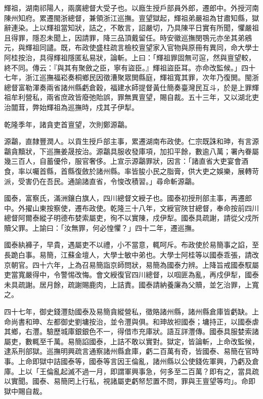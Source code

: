 \begin{pinyinscope}
輝祖，湖南祁陽人，兩廣總督大受子也。以廕生授戶部員外郎，遷郎中。外授河南陳州知府。累遷閩浙總督，兼領浙江巡撫。亶望獄起，輝祖弟嚴祖為甘肅知縣，獄辭連染。上以輝祖當知狀，詰之，不敢言，詔嚴切，乃具陳平日實有所聞，懼嚴祖且得罪，隱忍未聞上，因請罪，降三品頂戴留任。時安徽巡撫閔鶚元亦坐其弟鵷元，與輝祖同譴。既，布政使盛柱疏言檢校亶望家入官物與原冊有異同，命大學士阿桂按治，具得輝祖隱匿私易狀，論斬。上曰：「輝祖罪固無可逭，然與亶望較，終不同。傳云：『與其有聚斂之臣，寧有盜臣。』輝祖盜臣耳。亦命改監候。」四十七年，浙江巡撫福崧奏桐鄉民因徵漕聚眾閧縣庭，輝祖寬其罪，次年乃復閧。閩浙總督富勒渾奏兩省諸州縣虧倉穀，福建水師提督黃仕簡奏臺灣民互斗，於是上罪輝祖牟利營私，兩省庶政皆廢弛貽誤，罪無異亶望，賜自裁。五十三年，又以湖北吏治闒茸，弊始輝祖為巡撫時，戍其子伊犁。

乾隆季年，諸貪吏首亶望，次則鄭源鸘。

源鸘，直隸豐潤人。以貢生授戶部主事，累遷湖南布政使。仁宗既誅和珅，有言源鸘貪黷狀，下巡撫姜晟按治。源鸘具服收發庫項，加扣平餘，數逾八萬；署內眷屬幾三百人，自蓄優伶，服官奢侈。上宣示源鸘罪狀，因言：「諸直省大吏宴會酒食，率以囑首縣，首縣復斂於諸州縣。率皆朘小民之脂膏，供大吏之娛樂，展轉苛派，受害仍在吾民。通諭諸直省，令悛改積習。」尋命斬源鸘。

國泰，富察氏，滿洲鑲白旗人，四川總督文綬子也。國泰初授刑部主事，再遷郎中。外擢山東按察使，遷布政使。乾隆三十八年，文綬官陜甘總督，奉命按前四川總督阿爾泰縱子明德布婪索屬吏，徇不以實陳，戍伊犁。國泰具疏謝，請從父戍所贖父罪。上諭曰：「汝無罪，何必惶懼？」四十二年，遷巡撫。

國泰紈褲子，早貴，遇屬吏不以禮，小不當意，輒呵斥。布政使於易簡事之諂，至長跪白事。易簡，江蘇金壇人，大學士敏中弟也。大學士阿桂等以國泰乖張，請改京朝官。四十六年，上為召易簡詣京師問狀，易簡為國泰力辨。上降旨戒國泰馭屬吏當寬嚴得中，令警惕改悔。會文綬復官四川總督，以啯匪為亂，再戍伊犁，國泰未具疏謝。居月餘，疏謝賜鹿肉，上詰責。國泰請納養廉為父贖，並乞治罪，上寬之。

四十七年，御史錢灃劾國泰及易簡貪縱營私，徵賂諸州縣，諸州縣倉庫皆虧缺。上命尚書和珅、左都御史劉墉按治，並令灃與俱。和珅故袒國泰；墉持正，以國泰虐其鄉，右灃。驗歷城庫銀銀色不一，得借市充庫狀。語互詳灃傳。國泰具服婪索諸屬吏，數輒至千萬。易簡諂國泰，上詰不敢以實對。獄定，皆論斬，上命改監候，逮系刑部獄。巡撫明興疏言通察諸州縣倉庫，虧二百萬有奇，皆國泰、易簡在官時事。上命即獄中詰國泰等，國泰等言因王倫亂，諸州縣以公使錢佐軍興，乃虧及倉庫。上以「王倫亂起滅不過一月，即謂軍興事急，何多至二百萬？即有之，當具疏以實聞。國泰、易簡罔上行私，視諸屬吏虧帑恝置不問，罪與王亶望等均」。命即獄中賜自裁。


\end{pinyinscope}
